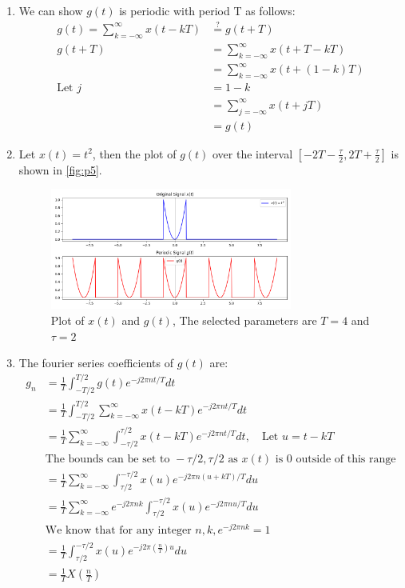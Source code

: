 \documentclass{article}
\begin{document}
\begin{enumerate}[label=5.\arabic*]
    \item We can show $g(t)$ is periodic with period T as follows:
    \begin{align*}
        g(t) = \sum_{k=-\infty}^{\infty} x(t - kT) &\stackrel{?}{=} g(t + T) \\
        g(t+T) &= \sum_{k=-\infty}^{\infty} x(t + T - kT) \\
        &= \sum_{k=-\infty}^{\infty} x(t + (1-k)T) \\
        \text{Let } j &= 1-k \\
        &= \sum_{j=-\infty}^{\infty} x(t + jT) \\
        &= g(t)
    \end{align*}
    \item Let $x(t) = t^2$, then the plot of $g(t)$ over the interval $[-2T - \frac{\tau}{2}, 2T + \frac{\tau}{2}]$ is shown in \autoref{fig:p5}.

    \begin{figure}[ht!]
        \centering
        \includegraphics[width=0.75\textwidth]{p5.png}
        \caption{Plot of $x(t)$ and $g(t)$, The selected parameters are $T = 4$ and $\tau = 2$}
        \label{fig:p5}
    \end{figure}

    \item The fourier series coefficients of $g(t)$ are:
    \begin{align*}
        g_n &= \frac{1}{T} \int_{-T/2}^{T/2} g(t) e^{-j2\pi n t/T} dt \\
        &= \frac{1}{T} \int_{-T/2}^{T/2} \sum_{k=-\infty}^{\infty} x(t - kT) e^{-j2\pi n t/T} dt \\
        &= \frac{1}{T}\sum_{k=-\infty}^{\infty} \int_{-\tau/2}^{\tau/2} x(t - kT) e^{-j2\pi n t/T} dt, \quad \text{Let } u = t - kT \\
        &\text{The bounds can be set to } -\tau/2, \tau/2 \text{ as } x(t) \text{ is } 0 \text{ outside of this range} \\
        &= \frac{1}{T}\sum_{k=-\infty}^{\infty} \int_{\tau/2}^{-\tau/2} x(u) e^{-j2\pi n (u + kT)/T} du \\
        &= \frac{1}{T}\sum_{k=-\infty}^{\infty} e^{-j2\pi n k} \int_{\tau/2}^{-\tau/2} x(u) e^{-j2\pi n u/T} du \\
        &\text{We know that for any integer } n, k, e^{-j2\pi nk} = 1 \\
        &= \frac{1}{T}\int_{\tau/2}^{-\tau/2} x(u) e^{-j2\pi \left(\frac{n}{T}\right)u} du \\
        &= \frac{1}{T} X\left(\frac{n}{T}\right)
    \end{align*}
\end{enumerate}
\end{document}

